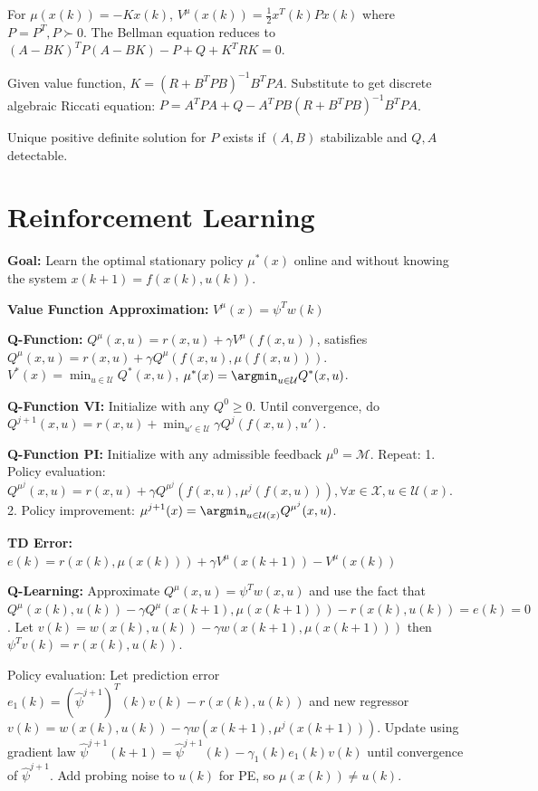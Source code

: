 \documentclass[twocolumn, 8pt]{extarticle}
\begin{document}
For \(\mu(x(k)) = -Kx(k)\), \(V^\mu(x(k)) = \frac{1}{2}x^T(k)Px(k)\) where \(P = P^T, P \succ 0\). The Bellman equation
reduces to \((A - BK)^TP(A - BK) - P + Q + K^TRK = 0\).

Given value function, \(K = (R + B^TPB)^{-1}B^TPA\). Substitute to get discrete algebraic Riccati equation:
\(P = A^TPA + Q - A^TPB(R + B^TPB)^{-1}B^TPA\).

Unique positive definite solution for \(P\) exists if \((A, B)\) stabilizable and \(Q, A\) detectable.

\section{Reinforcement Learning} %

\textbf{Goal:} Learn the optimal stationary policy \(\mu^*(x)\) online and without knowing the system \(x(k + 1) = f(x(k), u(k))\).

\textbf{Value Function Approximation:} \(V^\mu(x) = \psi^Tw(k)\)

\textbf{Q-Function:} \(Q^\mu(x, u) = r(x, u) + \gamma V^\mu(f(x, u))\),
satisfies \(Q^\mu(x, u) = r(x, u) + \gamma Q^\mu(f(x, u), \mu(f(x, u)))\).
\(\displaystyle V^*(x) = \min _{u \in \mathcal U} Q^*(x, u)\), \(\displaystyle \mu^*(x) = \argmin _{u \in \mathcal U} Q^*(x, u)\).

\textbf{Q-Function VI:} Initialize with any $Q^0 \geq 0$. Until convergence, do
$\displaystyle Q^{j + 1}(x, u) = r(x, u) + \min _{u' \in \mathcal U} \gamma Q^j(f(x, u), u')$.

\textbf{Q-Function PI:} Initialize with any admissible feedback $\mu^0 = \mathcal M$. Repeat:
1. Policy evaluation: \(Q^{\mu^j}(x, u) = r(x, u) + \gamma Q^{\mu^j}(f(x, u), \mu^j(f(x, u))), \forall x \in \mathcal X, u \in \mathcal U(x)\).
2. Policy improvement: $\displaystyle \mu^{j + 1}(x) = \argmin _{u \in \mathcal U(x)} Q^{\mu^j}(x, u)$.

\textbf{TD Error:} \(e(k) = r(x(k), \mu(x(k))) + \gamma V^\mu(x(k + 1)) - V^\mu(x(k))\)

\textbf{Q-Learning:} Approximate \(Q^\mu(x, u) = \psi^Tw(x, u)\) and use the fact that
\(Q^\mu(x(k), u(k)) - \gamma Q^\mu(x(k + 1), \mu(x(k + 1))) - r(x(k), u(k)) = e(k) = 0\).
Let \(v(k) = w(x(k), u(k)) - \gamma w(x(k + 1), \mu(x(k + 1)))\) then \(\psi^Tv(k) = r(x(k), u(k))\).

Policy evaluation: Let prediction error \(e_1(k) = (\hat\psi^{j + 1})^T(k)v(k) - r(x(k), u(k))\) and new regressor
\(v(k) = w(x(k), u(k)) - \gamma w(x(k + 1), \mu^j(x(k + 1)))\). Update using gradient law \(\hat\psi^{j + 1}(k + 1) =
\hat\psi^{j + 1}(k) - \gamma _1(k)e_1(k)v(k)\) until convergence of \(\hat\psi^{j + 1}\). Add probing noise to \(u(k)\)
for PE, so \(\mu(x(k)) \neq u(k)\).
\end{document}
